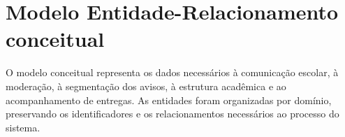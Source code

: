 \section{Modelo Entidade-Relacionamento conceitual}
O modelo conceitual representa os dados necessários à comunicação escolar, à moderação, à segmentação dos avisos, à estrutura acadêmica e ao acompanhamento de entregas. As entidades foram organizadas por domínio, preservando os identificadores e os relacionamentos necessários ao processo do sistema.
